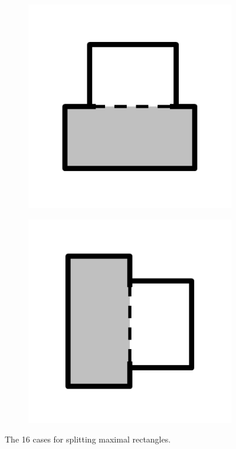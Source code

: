 \documentclass{article}
\begin{document}
\begin{figure}[!h]
\begin{subfigure}{.25\textwidth}
    \caption{}
    \label{fig:c14}
  \end{subfigure}%
  \begin{subfigure}{.25\textwidth}
    \centering
    \includegraphics[width=.95\linewidth]{16cases/c15.png}
    \caption{}
    \label{fig:c15}
  \end{subfigure}%
  \begin{subfigure}{.25\textwidth}
    \centering
    \includegraphics[width=.95\linewidth]{16cases/c16.png}
    \caption{}
    \label{fig:c16}
  \end{subfigure}%
  \caption{The 16 cases for splitting maximal rectangles.}
  \label{fig:maxrectsplitting}
\end{figure}
\end{document}
